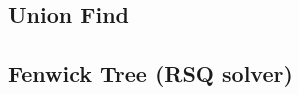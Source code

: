 %             
%     
\subsection{Union Find}
\label{unionFind}

\subsection{Fenwick Tree (RSQ solver)}

